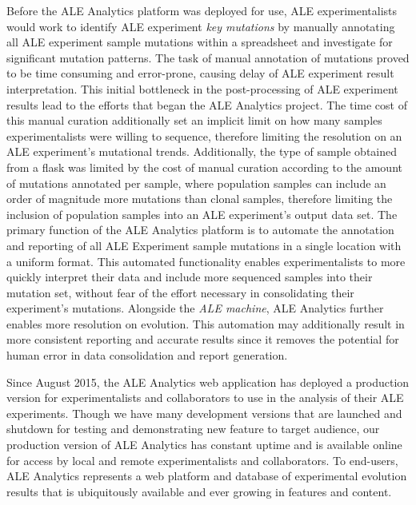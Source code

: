 \documentclass[12pt,final,masters,chapterheads]{ucsd}  %
\begin{document}
%
%
Before the ALE Analytics platform was deployed for use, ALE experimentalists would work to identify ALE experiment \textit{key mutations} by manually annotating all ALE experiment sample mutations within a spreadsheet and investigate for significant mutation patterns. The task of manual annotation of mutations proved to be time consuming and error-prone, causing delay of ALE experiment result interpretation. This initial bottleneck in the post-processing of ALE experiment results lead to the efforts that began the ALE Analytics project. The time cost of this manual curation additionally set an implicit limit on how many samples experimentalists were willing to sequence, therefore limiting the resolution on an ALE experiment's mutational trends. Additionally, the type of sample obtained from a flask was limited by the cost of manual curation according to the amount of mutations annotated per sample, where population samples can include an order of magnitude more mutations than clonal samples, therefore limiting the inclusion of population samples into an ALE experiment's output data set. The primary function of the ALE Analytics platform is to automate the annotation and reporting of all ALE Experiment sample mutations in a single location with a uniform format. This automated functionality enables experimentalists to more quickly interpret their data and include more sequenced samples into their mutation set, without fear of the effort necessary in consolidating their experiment's mutations. Alongside the \textit{ALE machine}, ALE Analytics further enables more resolution on evolution. This automation may additionally result in more  consistent reporting and accurate results since it removes the potential for human error in data consolidation and report generation.

Since August 2015, the ALE Analytics web application has deployed a production version for experimentalists and collaborators to use in the analysis of their ALE experiments. Though we have many development versions that are launched and shutdown for testing and demonstrating new feature to target audience, our production version of ALE Analytics has constant uptime and is available online for access by local and remote experimentalists and collaborators. To end-users, ALE Analytics represents a web platform and database of experimental evolution results that is ubiquitously available and ever growing in features and content.
\end{document}

